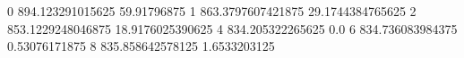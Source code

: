 0 894.123291015625 59.91796875
1 863.3797607421875 29.1744384765625
2 853.1229248046875 18.9176025390625
4 834.205322265625 0.0
6 834.736083984375 0.53076171875
8 835.858642578125 1.6533203125
